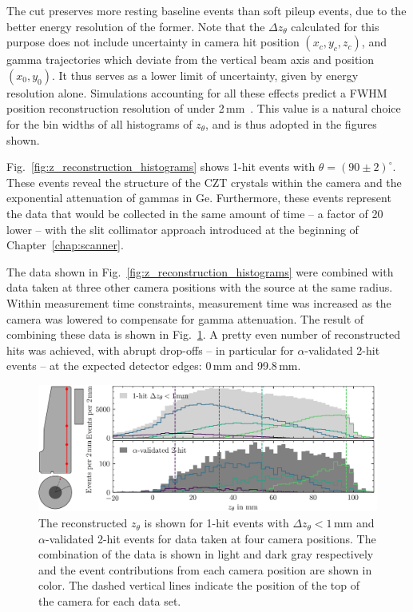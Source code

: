 The cut preserves more resting baseline events than soft pileup events, due to the better energy resolution of the former. Note that the $\Delta z_\theta$ calculated for this purpose does not include uncertainty in camera hit position $(x_c,y_c,z_c)$, and gamma trajectories which deviate from the vertical \CsS{} beam axis and position $(x_0,y_0)$. It thus serves as a lower limit of uncertainty, given by energy resolution alone. Simulations accounting for all these effects predict a FWHM position reconstruction resolution of under 2\,mm~\cite{compton_scanner}. This value is a natural choice for the bin widths of all histograms of $z_\theta$, and is thus adopted in the figures shown. 

Fig.~\ref{fig:z_reconstruction_histograms} shows 1-hit events with $\theta = (90\pm2)^\circ$. These events reveal the structure of the CZT crystals within the camera and the exponential attenuation of gammas in Ge. Furthermore, these events represent the data that would be collected in the same amount of time -- a factor of 20 lower -- with the slit collimator approach introduced at the beginning of Chapter~\ref{chap:scanner}. 

The data shown in Fig.~\ref{fig:z_reconstruction_histograms} were combined with data taken at three other camera positions with the \CsS{} source at the same radius. Within measurement time constraints, measurement time was increased as the camera was lowered to compensate for gamma attenuation. The result of combining these data is shown in Fig.~\ref{fig:z_reconstruction_combined}. A pretty even number of reconstructed hits was achieved, with abrupt drop-offs -- in particular for $\alpha$-validated 2-hit events -- at the expected detector edges: 0\,mm and 99.8\,mm.
\begin{figure}[htb]
    \centering
    \includegraphics[width=6in]{figs/pipeline/z_reconstruction_combined.png}
    \caption{The reconstructed $z_\theta$ is shown for 1-hit events with $\Delta z_\theta < 1$\,mm and $\alpha$-validated 2-hit events for data taken at four camera positions. The combination of the data is shown in light and dark gray respectively and the event contributions from each camera position are shown in color. The dashed vertical lines indicate the position of the top of the camera for each data set.}
    \label{fig:z_reconstruction_combined}
\end{figure}

